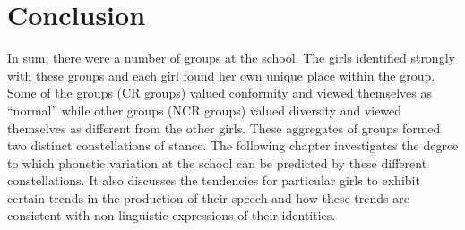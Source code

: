 \section{Conclusion}

In sum, there were a number of groups at the school. The girls identified strongly with these groups and each girl found her own unique place within the group. Some of the groups (CR groups) valued conformity and viewed themselves as ``normal'' while other groups (NCR groups) valued diversity and viewed themselves as different from the other girls. These aggregates of groups formed two distinct constellations of stance. The following chapter investigates the degree to which phonetic variation at the school can be predicted by these different constellations. It also discusses the tendencies for particular girls to exhibit certain trends in the production of their speech and how these trends are consistent with non-linguistic expressions of their identities.


\newpage
\thispagestyle{empty}
\mbox{}